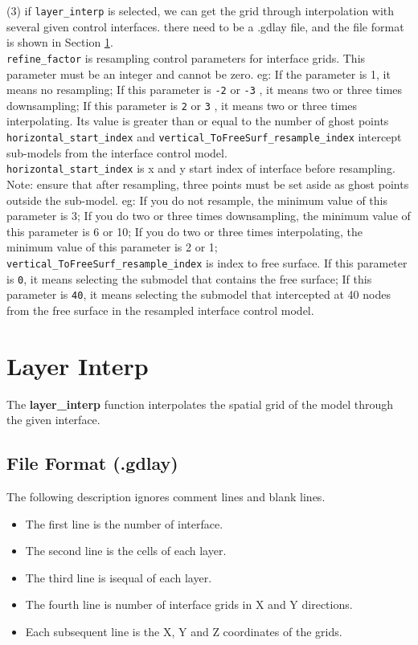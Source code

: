 (3) if \texttt{layer\_interp} is selected, we can get the grid through interpolation with several given control interfaces. there need to be a .gdlay file, and the file format is shown in Section \ref{gridlayerinterp}. \\
\texttt{refine\_factor} is resampling control parameters for interface grids. This parameter must be an integer and cannot be zero. eg: If the parameter is 1, it means no resampling; If this parameter is \texttt{-2} or \texttt{-3} , it means two or three times  downsampling; If this parameter is \texttt{2} or \texttt{3} , it means two or three times interpolating. Its value is greater than or equal to the number of ghost points\\
\texttt{horizontal\_start\_index}  and \texttt{vertical\_ToFreeSurf\_resample\_index} intercept sub-models from the interface control model. \\
\texttt{horizontal\_start\_index} is x and y start index of  interface before resampling. Note: ensure that after resampling, three points must be set aside as ghost points outside the sub-model. eg: If you do not resample, the minimum value of this parameter is 3; If you do two or three times  downsampling, the minimum value of this parameter is 6 or 10; If you do two or three times interpolating, the minimum value of this parameter is 2 or 1; \\
\texttt{vertical\_ToFreeSurf\_resample\_index} is index to free surface. If this parameter is \texttt{0}, it means selecting the submodel that contains the free surface; If this parameter is \texttt{40}, it means selecting the submodel that intercepted at 40 nodes from the free surface  in the resampled interface control model. 
\section{Layer Interp} \label{gridlayerinterp}
The \textbf{layer\_interp} function interpolates the spatial grid of the model through the given interface.

\subsection{File Format (.gdlay)}

The following description ignores comment lines and blank lines.
\begin{itemize}
 \item The first line is the number of interface.
 \item {The second line is the cells of each layer.}
 \item {The third line is isequal of each layer.}
  \item {The fourth line is number of interface grids in X and Y directions.}
  \item {Each subsequent line is the X, Y and Z coordinates of the grids.}
\end{itemize}

